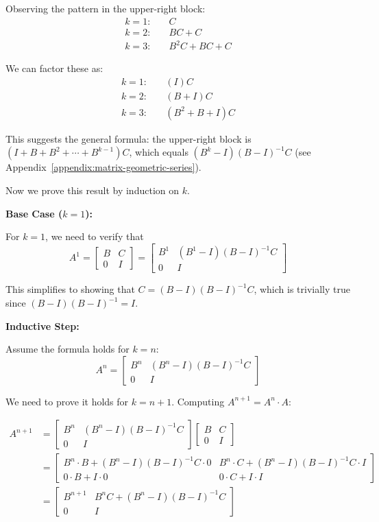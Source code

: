 Observing the pattern in the upper-right block:
\begin{align*}
k=1: &\quad C \\
k=2: &\quad BC + C \\
k=3: &\quad B^2C + BC + C
\end{align*}

We can factor these as:
\begin{align*}
k=1: &\quad (I)C \\
k=2: &\quad (B + I)C \\
k=3: &\quad (B^2 + B + I)C
\end{align*}

This suggests the general formula: the upper-right block is $(I + B + B^2 + \cdots + B^{k-1})C$, which equals $(B^k - I)(B - I)^{-1}C$ (see Appendix~\ref{appendix:matrix-geometric-series}).

\vspace{1em}

Now we prove this result by induction on $k$.

\textbf{Base Case ($k=1$):}

For $k=1$, we need to verify that 
$$A^1 = \begin{bmatrix} B & C \\ 0 & I \end{bmatrix} = \begin{bmatrix} B^1 & (B^1 - I)(B - I)^{-1}C \\ 0 & I \end{bmatrix}$$

This simplifies to showing that $C = (B - I)(B - I)^{-1}C$, which is trivially true since $(B - I)(B - I)^{-1} = I$.

\textbf{Inductive Step:}

Assume the formula holds for $k = n$:
$$A^n = \begin{bmatrix} B^n & (B^n - I)(B - I)^{-1}C \\ 0 & I \end{bmatrix}$$

We need to prove it holds for $k = n+1$. Computing $A^{n+1} = A^n \cdot A$:

\begin{align*}
A^{n+1} &= \begin{bmatrix} B^n & (B^n - I)(B - I)^{-1}C \\ 0 & I \end{bmatrix} \begin{bmatrix} B & C \\ 0 & I \end{bmatrix} \\[8pt]
&= \begin{bmatrix} B^n \cdot B + (B^n - I)(B - I)^{-1}C \cdot 0 & B^n \cdot C + (B^n - I)(B - I)^{-1}C \cdot I \\ 0 \cdot B + I \cdot 0 & 0 \cdot C + I \cdot I \end{bmatrix} \\[8pt]
&= \begin{bmatrix} B^{n+1} & B^n C + (B^n - I)(B - I)^{-1}C \\ 0 & I \end{bmatrix}
\end{align*}

